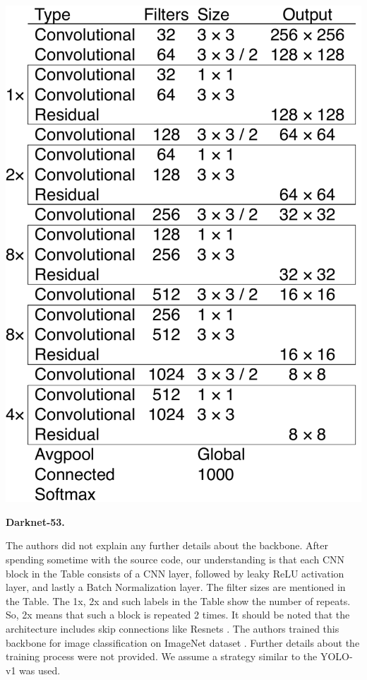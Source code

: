 \documentclass[10pt,twocolumn,letterpaper]{article}
\begin{document}
\begin{table}[h] 
\begin{center}
\includegraphics[width=.8\linewidth]{arch2.pdf}
\end{center}
\caption{\small \textbf{Darknet-53.}}
\label{network_architecture}
\end{table}

The authors did not explain any further details about the backbone. After spending sometime with the source code, our understanding is that each CNN block in the Table consists of a CNN layer, followed by leaky ReLU activation layer, and lastly a Batch Normalization layer. The filter sizes are mentioned in the Table. The 1x, 2x and such labels in the Table show the number of repeats. So, 2x means that such a block is repeated 2 times. It should be noted that the architecture includes skip connections like Resnets \cite{Resnets}. The authors trained this backbone for image classification on ImageNet dataset \cite{imagenet_dataset}. Further details about the training process were not provided. We assume a strategy similar to the YOLO-v1 was used.
\end{document}
